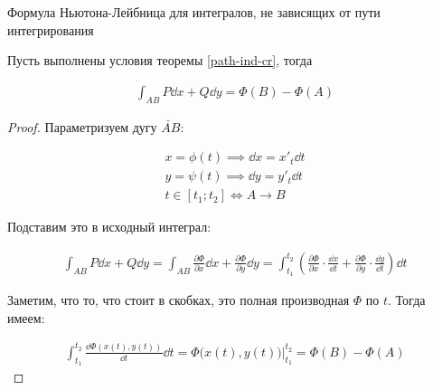 
\begin{theorem}
  Формула Ньютона-Лейбница для интегралов, не зависящих от пути интегрирования

  Пусть выполнены условия теоремы \ref{path-ind-cr}, тогда

  \begin{align*}
    \int_{AB} P \dd x + Q \dd y = \Phi(B) - \Phi(A)
  \end{align*}
\end{theorem}
\begin{proof}
  Параметризуем дугу \(\breve{AB}\):

  \begin{align*}
    x = \phi(t) \implies \dd x = x'_{t} \dd t \\
    y = \psi(t) \implies \dd y = y'_{t} \dd t \\
    t \in [t_{1}; t_{2}] \iff A \to B
  \end{align*}

  Подставим это в исходный интеграл:

  \begin{align*}
    \int_{AB} P \dd x + Q \dd y
    = \int_{AB} \frac{\partial \Phi}{\partial x} \dd x
      + \frac{\partial \Phi}{\partial y} \dd y
    = \int_{t_{1}}^{t_{2}} \left(
      \frac{\partial \Phi}{\partial x} \cdot \frac{\dd x}{\dd t} 
      + \frac{\partial \Phi}{\partial y} \cdot \frac{\dd y}{\dd t} 
    \right) \dd t  
  \end{align*}

  Заметим, что то, что стоит в скобках, это полная производная \(\Phi\) по
  \(t\). Тогда имеем:

  \begin{align*}
    \int_{t_{1}}^{t_{2}} \frac{\dd \Phi(x(t), y(t))}{\dd t} \dd t
    = \Phi \Big( x(t), y(t) \Big) \bigg\vert_{t_{1}}^{t_{2}}
    = \Phi(B) - \Phi(A)
  \end{align*}
\end{proof}

